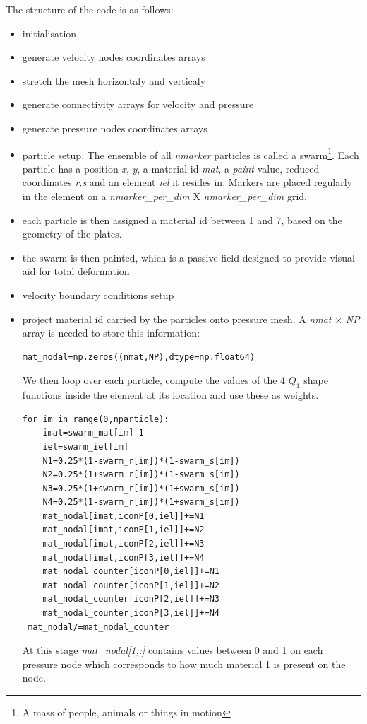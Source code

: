 The structure of the code is as follows:
\begin{itemize}
\item initialisation
\item generate velocity nodes coordinates arrays
\item stretch the mesh horizontaly and verticaly
\item generate connectivity arrays for velocity and pressure 
\item generate pressure nodes coordinates arrays
\item particle setup. The ensemble of all {\sl nmarker} particles is called a swarm\footnote{A mass of people, animals or things in motion}. Each particle has a position {\sl x}, {\sl y}, a material id {\sl mat}, a {\sl paint} value, reduced coordinates {\sl r,s} and an element {\sl iel} it resides in. Markers are placed regularly in the element on a {\sl nmarker\_per\_dim} X {\sl nmarker\_per\_dim} grid. 
\item each particle is then assigned a material id between 1 and 7, based on the geometry of the plates.
\item the swarm is then painted, which is a passive field designed to provide visual aid for total deformation 
\item velocity boundary conditions setup
\item project material id carried by the particles onto pressure mesh. A {\sl nmat} $\times$ {\sl NP} 
array is needed to store this information:
\begin{lstlisting}
mat_nodal=np.zeros((nmat,NP),dtype=np.float64)
\end{lstlisting}
We then loop over each particle, compute the values of the 4 $Q_1$ shape functions inside the element at its location and use these as weights. 
\begin{lstlisting}
for im in range(0,nparticle):
    imat=swarm_mat[im]-1
    iel=swarm_iel[im]
    N1=0.25*(1-swarm_r[im])*(1-swarm_s[im])
    N2=0.25*(1+swarm_r[im])*(1-swarm_s[im])
    N3=0.25*(1+swarm_r[im])*(1+swarm_s[im])
    N4=0.25*(1-swarm_r[im])*(1+swarm_s[im])
    mat_nodal[imat,iconP[0,iel]]+=N1
    mat_nodal[imat,iconP[1,iel]]+=N2
    mat_nodal[imat,iconP[2,iel]]+=N3
    mat_nodal[imat,iconP[3,iel]]+=N4
    mat_nodal_counter[iconP[0,iel]]+=N1
    mat_nodal_counter[iconP[1,iel]]+=N2
    mat_nodal_counter[iconP[2,iel]]+=N3
    mat_nodal_counter[iconP[3,iel]]+=N4
 mat_nodal/=mat_nodal_counter
\end{lstlisting}

At this stage {\sl mat\_nodal[1,:]} contains values between 0 and 1 on each pressure node which corresponds to 
how much material 1 is present on the node. 


\end{itemize}

